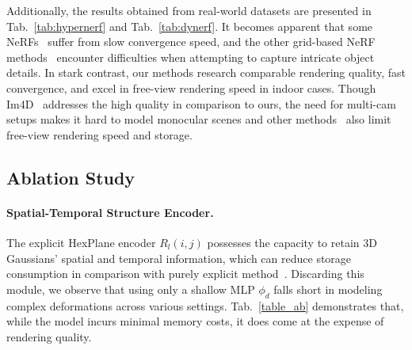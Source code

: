 \documentclass[10pt,twocolumn,letterpaper]{article}
\begin{document}
Additionally, the results obtained from real-world datasets are presented in Tab.~\ref{tab:hypernerf} and Tab.~\ref{tab:dynerf}.  It becomes apparent that some NeRFs~\cite{song2023nerfplayer,attal2023hyperreel,hexplane} suffer from slow convergence speed, and the other grid-based NeRF methods~\cite{tineuvox,hexplane,msth,kplanes} encounter difficulties when attempting to capture intricate object details. In stark contrast, our methods research comparable rendering quality, fast convergence, and excel in free-view rendering speed in indoor cases. Though Im4D~\cite{lin2023im4d} addresses the high quality in comparison to ours, the need for multi-cam setups makes it hard to model monocular scenes and other methods~\cite{msth,kplanes,hexplane,attal2023hyperreel,song2023nerfplayer} also limit free-view rendering speed and storage.
\vspace{-5pt}
\subsection{Ablation Study}
\label{subsec:ablation study}
\paragraph{Spatial-Temporal Structure Encoder.}
The explicit HexPlane encoder $R_l(i,j)$ possesses the capacity to retain 3D Gaussians' spatial and temporal information, which can reduce storage consumption in comparison with purely explicit method~\cite{dynamic3dgs}. Discarding this module, we observe that using only a shallow MLP $\phi_d$ falls short in modeling complex deformations across various settings. Tab.~\ref{table_ab} demonstrates that, while the model incurs minimal memory costs, it does come at the expense of rendering quality. 

\end{document}
